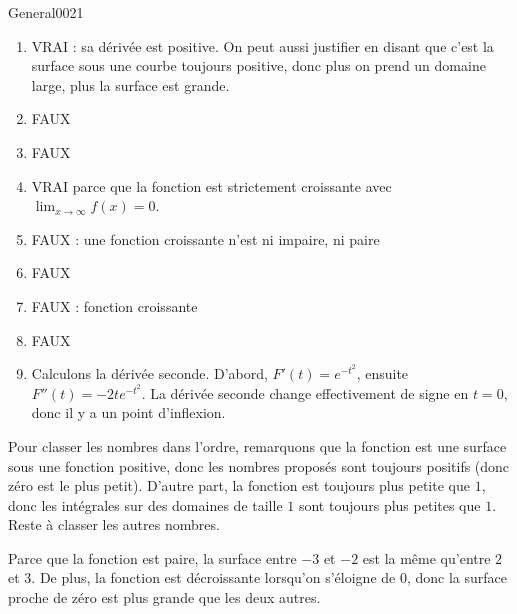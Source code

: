 \begin{corrige}{General0021}

\begin{enumerate}

\item
VRAI : sa dérivée est positive. On peut aussi justifier en disant que c'est la surface sous une courbe toujours positive, donc plus on prend un domaine large, plus la surface est grande.

\item
FAUX
\item
FAUX
\item
VRAI parce que la fonction est strictement croissante avec $\lim_{x\to\infty}f(x)=0$.
\item
FAUX : une fonction croissante n'est ni impaire, ni paire
\item
FAUX
\item
FAUX : fonction croissante
\item
FAUX
\item
Calculons la dérivée seconde. D'abord, $F'(t)= e^{-t^2}$, ensuite $F''(t)=-2t e^{-t^2}$. La dérivée seconde change effectivement de signe en $t=0$, donc il y a un point d'inflexion.

\end{enumerate}

Pour classer les nombres dans l'ordre, remarquons que la fonction est une surface sous une fonction positive, donc les nombres proposés sont toujours positifs (donc zéro est le plus petit). D'autre part, la fonction est toujours plus petite que $1$, donc les intégrales sur des domaines de taille $1$ sont toujours plus petites que $1$. Reste à classer les autres nombres.

Parce que la fonction est paire, la surface entre $-3$ et $-2$ est la même qu'entre $2$ et $3$. De plus, la fonction est décroissante lorsqu'on s'éloigne de $0$, donc la surface proche de zéro est plus grande que les deux autres.

\end{corrige}
